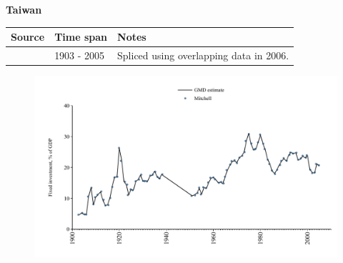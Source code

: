 \documentclass[12pt,a4paper,landscape]{article}
\begin{document}
\begin{adjustbox}{max totalsize={\paperwidth}{\paperheight},center}
\begin{minipage}[t][\textheight][t]{\textwidth}
\vspace*{0.5cm}
{}
\begin{center}
{\Large\bfseries Taiwan}
\end{center}
\vspace{0.5cm}
\begin{table}[H]
\centering
\small
\begin{tabular}{|l|l|l|}
\hline
\textbf{Source} & \textbf{Time span} & \textbf{Notes} \\
\hline
\rowcolor{white}\cite{Mitchell}& 1903 - 2005 &Spliced using overlapping data in 2006.\\
\hline
\end{tabular}
\end{table}
\begin{figure}[H]
\centering
\includegraphics[width=\textwidth,height=0.6\textheight,keepaspectratio]{graphs/TWN_finv_GDP.pdf}
\end{figure}
\end{minipage}
\end{adjustbox}
\end{document}
